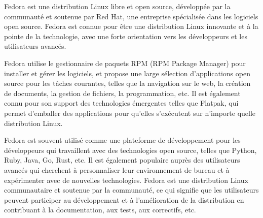 Fedora est une distribution Linux libre et open source, développée par la communauté et soutenue par Red Hat, une entreprise spécialisée dans les logiciels open source. Fedora est connue pour être une distribution Linux innovante et à la pointe de la technologie, avec une forte orientation vers les développeurs et les utilisateurs avancés.

Fedora utilise le gestionnaire de paquets RPM (RPM Package Manager) pour installer et gérer les logiciels, et propose une large sélection d'applications open source pour les tâches courantes, telles que la navigation sur le web, la création de documents, la gestion de fichiers, la programmation, etc. Il est également connu pour son support des technologies émergentes telles que Flatpak, qui permet d'emballer des applications pour qu'elles s'exécutent sur n'importe quelle distribution Linux.

Fedora est souvent utilisé comme une plateforme de développement pour les développeurs qui travaillent avec des technologies open source, telles que Python, Ruby, Java, Go, Rust, etc. Il est également populaire auprès des utilisateurs avancés qui cherchent à personnaliser leur environnement de bureau et à expérimenter avec de nouvelles technologies. Fedora est une distribution Linux communautaire et soutenue par la communauté, ce qui signifie que les utilisateurs peuvent participer au développement et à l'amélioration de la distribution en contribuant à la documentation, aux tests, aux correctifs, etc.
